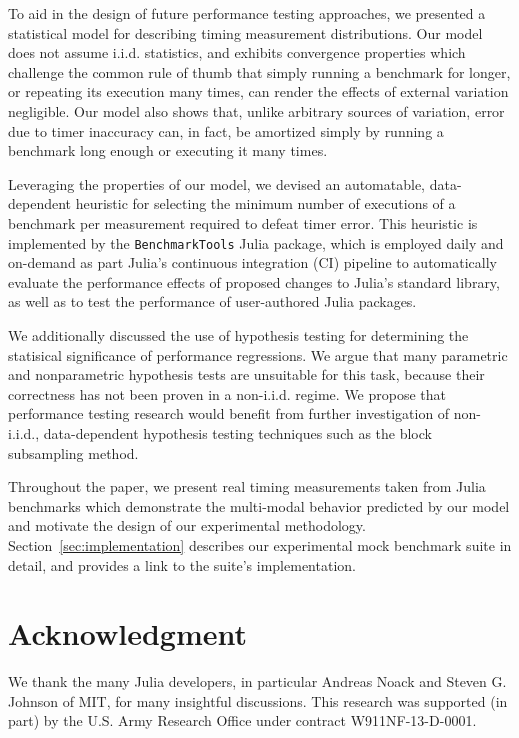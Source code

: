 \documentclass[conference]{IEEEtran}
\begin{document}
To aid in the design of future performance testing approaches, we presented a statistical
model for describing timing measurement distributions. Our model does not assume i.i.d.
statistics, and exhibits convergence properties which challenge the common rule of thumb
that simply running a benchmark for longer, or repeating its execution many times, can
render the effects of external variation negligible. Our model also shows that, unlike
arbitrary sources of variation, error due to timer inaccuracy can, in fact, be amortized
simply by running a benchmark long enough or executing it many times.

Leveraging the properties of our model, we devised an automatable, data-dependent heuristic
for selecting the minimum number of executions of a benchmark per measurement required to
defeat timer error. This heuristic is implemented by the \lstinline|BenchmarkTools| Julia
package, which is employed daily and on-demand as part Julia's continuous integration (CI)
pipeline to automatically evaluate the performance effects of proposed changes to Julia's
standard library, as well as to test the performance of user-authored Julia packages.

We additionally discussed the use of hypothesis testing for determining the statisical
significance of performance regressions. We argue that many parametric and nonparametric
hypothesis tests are unsuitable for this task, because their correctness has not been proven
in a non-i.i.d. regime. We propose that performance testing research would benefit from
further investigation of non-i.i.d., data-dependent hypothesis testing techniques such as
the block subsampling method.

Throughout the paper, we present real timing measurements taken from Julia benchmarks which
demonstrate the multi-modal behavior predicted by our model and motivate the design of our
experimental methodology. Section~\ref{sec:implementation} describes our experimental mock
benchmark suite in detail, and provides a link to the suite's implementation.

\label{sec:acknowledgement}
\section*{Acknowledgment}

We thank the many Julia developers, in particular Andreas Noack and Steven G.
Johnson of MIT, for many insightful discussions.
This research was supported (in part) by the U.S. Army Research Office under
contract W911NF-13-D-0001.




\end{document}
